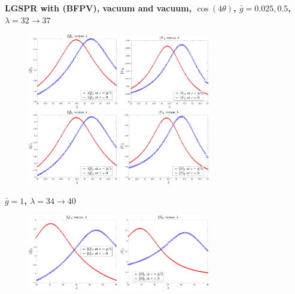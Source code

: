 \documentclass[11pt]{article}
\begin{document}
\newpage
\noindent\textbf{\large LGSPR  with (BFPV), vacuum and vacuum, $\cos(4\theta)$, $\bar{g} = 0.025, 0.5$, $\lambda=32 \to 37$}
\begin{figure}[H]
	\centering
	\subfigure
	{\includegraphics[width=0.35\textwidth]
		{fig_LGSPR_IIO_Qu_shift_cos4_gbar25_VACUUM_BFPV.pdf}}
	\quad
	\subfigure 
	{\includegraphics[width=0.35\textwidth]
		{fig_LGSPR_IIO_Sw_shift_cos4_gbar25_VACUUM_BFPV.pdf}}
	\\
	\subfigure
	{\includegraphics[width=0.35\textwidth]
		{fig_LGSPR_IIO_Qu_shift_cos4_gbar100_VACUUM_BFPV.pdf}}
	\quad
	\subfigure 
	{\includegraphics[width=0.35\textwidth]
		{fig_LGSPR_IIO_Sw_shift_cos4_gbar100_VACUUM_BFPV.pdf}}
\end{figure}
\noindent\textbf{$\bar{g} = 1$, $\lambda=34 \to 40$}
\begin{figure}[H]
	\centering	
	\subfigure 
	{\includegraphics[width=0.35\textwidth]
		{fig_LGSPR_IIO_Qu_shift_cos4_gbar1000_VACUUM_BFPV.pdf}}
	\quad
	\subfigure 
	{\includegraphics[width=0.35\textwidth]
		{fig_LGSPR_IIO_Sw_shift_cos4_gbar1000_VACUUM_BFPV.pdf}}
\end{figure}
\end{document}
